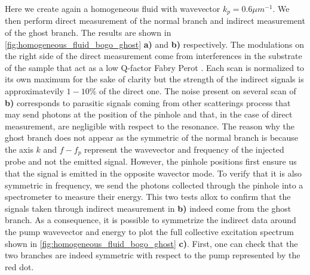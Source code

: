 Here we create again a homogeneous fluid with wavevector $k_p =0.6 \mu m^{-1}$. We then 
perform direct measurement of the normal branch and indirect measurement of the ghost branch. The results are shown in \autoref{fig:homogeneous_fluid_bogo_ghost} \textbf{a)} and \textbf{\textbf{b)}} respectively.  The modulations on the right side of the direct measurement come from interferences in the substrate of the sample
that act as a low Q-factor Fabry Perot \cite{claude_phd}. Each scan is normalized to its own maximum for the sake of clarity but 
the strength of the indirect signals is approximatevily $1-10\%$ of the direct one. The noise present on several scan of \textbf{b)} corresponds to parasitic signals coming from other scatterings process that may send photons at the position of the pinhole and that, in the case of direct measurement, are negligible with respect to the resonance. The reason why the ghost branch does not appear as the symmetric of the normal branch 
is because the axis $k$ and $f-f_p$ represent the wavevector and frequency of the injected probe and not the emitted signal. However, the pinhole positions first ensure us that the signal is emitted in the opposite wavector mode. To verify that it is also symmetric in frequency, we send the photons collected through the pinhole 
into a spectrometer to measure their energy. This two tests allox to confirm that the signals taken through indirect measurement in \textbf{\textbf{b)}} indeed come from the ghost branch. As a consequence, it is possible  to symmetrize the indirect data around the pump wavevector and energy to plot the full collective excitation spectrum shown in \autoref{fig:homogeneous_fluid_bogo_ghost} \textbf{c)}. First, one can check that the two branches 
are indeed symmetric with respect to the pump represented by the red dot.
